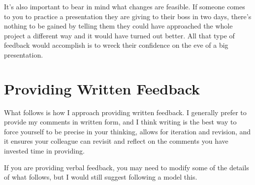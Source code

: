 \documentclass[letterpaper,10pt,english]{jupyterBook}
\begin{document}
\sphinxAtStartPar
It’s also important to bear in mind what changes are feasible. If someone comes to you to practice a presentation they are giving to their boss in two days, there’s nothing to be gained by telling them they could have approached the whole project a different way and it would have turned out better. All that type of feedback would accomplish is to wreck their confidence on the eve of a big presentation.


\section{Providing Written Feedback}
\label{\detokenize{40_in_practice/30_giving_feedback:providing-written-feedback}}
\sphinxAtStartPar
What follows is how I approach providing written feedback. I generally prefer to provide my comments in written form, and I think writing is the best way to force yourself to be precise in your thinking, allows for iteration and revision, and it ensures your colleague can revisit and reflect on the comments you have invested time in providing.

\sphinxAtStartPar
If you are providing verbal feedback, you may need to modify some of the details of what follows, but I would still suggest following a model  this.
\end{document}
